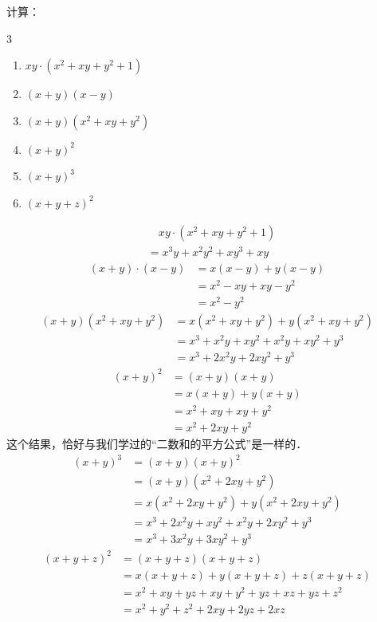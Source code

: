 \begin{example}
计算：
 \begin{multicols}{3}
\begin{enumerate}
    \item $xy\cdot (x^2+xy+y^2+1)$
    \item $(x+y)(x-y)$
    \item $(x+y)(x^2+xy+y^2)$
    \item $(x+y)^2$
    \item $(x+y)^3$
    \item $(x+y+z)^2$
\end{enumerate}
    \end{multicols}

\end{example}

\begin{solution}
\begin{align*}
     &\quad    xy\cdot (x^2+xy+y^2+1)\\
     &=x^3y+x^2y^2+xy^3+xy \tag{分配律}
    \end{align*}
\begin{align*}
        (x+y)\cdot (x-y)&=x(x-y)+y(x-y) \tag{分配律}\\
        &=x^2-xy+xy-y^2  \\
        &=x^2-y^2\tag{合并同类项法则}
    \end{align*}
\begin{align*}
        (x+y)(x^2+xy+y^2)&= x(x^2+xy+y^2)+y(x^2+xy+y^2)\\
        &=x^3+x^2y+xy^2+x^2y+xy^2+y^3\\
        &=x^3+2x^2y+2xy^2+y^3
    \end{align*}
\begin{align*}
        (x+y)^2&=(x+y)(x+y)\\
        &=x(x+y)+y(x+y)\\
        &=x^2+xy+xy+y^2\\
        &=x^2+2xy+y^2
    \end{align*}
    这个结果，恰好与我们学过的“二数和的平方公式”是一样的．
\begin{align*}
        (x+y)^3&=(x+y)(x+y)^2\\
        &=(x+y)(x^2+2xy+y^2)\\
        &=x(x^2+2xy+y^2)+y(x^2+2xy+y^2)\\
        &=x^3+2x^2y+xy^2+x^2y+2xy^2+y^3     \\
        &=x^3+3x^2y+3xy^2+y^3
    \end{align*}
\begin{align*}
        (x+y+z)^2&=(x+y+z)(x+y+z)\\
        &=x(x+y+z)+y(x+y+z)+z(x+y+z)\\
        &=x^2+xy+yz+xy+y^2+yz+xz+yz+z^2\\
        &=x^2+y^2+z^2+2xy+2yz+2xz    \\
    \end{align*}
\end{solution}

